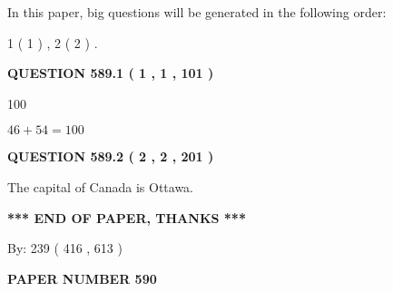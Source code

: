 \documentclass[12pt]{article}
\begin{document}
   
   
\vspace{0.2in}
   
In this paper, big questions will be generated in the following order: 
   
   
   1 ( 1 )
 ,
   2 ( 2 )
 .
  
\vspace{0.2in}
  
{\textbf{\Large{QUESTION
589.1 
 ( 1 , 1 , 101 )
}}}
  
  
 
 
\noindent{}

100
 
 
 
 
\noindent{}

$ %
46 +  %
54=   %
100$
 
 
  
\vspace{0.2in}
  
{\textbf{\Large{QUESTION
589.2 
 ( 2 , 2 , 201 )
}}}
  
  
 
 
\noindent{}
 
 
The capital of Canada is Ottawa.
 
 
 
 
   
   
 \vspace{0.2in}
 
   
   
   
   
\vspace{1.0in} 
{\textbf{\large{ *** END OF PAPER, THANKS *** }}} 
   
   
\hspace{1.0in} By: 
 239 ( 416 ,  613 )
   
   
   
   
\newpage 
\setcounter{page}{ 
   590001 } 
   
   
   
   
 {\textbf{ \Large{ PAPER NUMBER  590  }}}
   
   
\vspace{0.2in}
   
   
   
\end{document}
